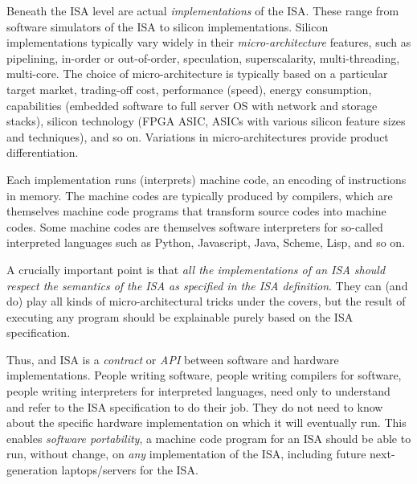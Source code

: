 
Beneath the ISA level are actual \emph{implementations} of the ISA.
These range from software simulators of the ISA to silicon
implementations.  Silicon implementations typically vary widely in
their \emph{micro-architecture} features, such as pipelining, in-order
or out-of-order, speculation, superscalarity, multi-threading,
multi-core.  The choice of micro-architecture is typically based on a
particular target market, trading-off cost, performance (speed),
energy consumption, capabilities (embedded software to full server OS
with network and storage stacks), silicon technology (FPGA {\vs} ASIC,
ASICs with various silicon feature sizes and techniques), and so on.
Variations in micro-architectures provide product differentiation.


Each implementation runs (interprets) machine code, {\ie} an encoding
of instructions in memory.  The machine codes are typically produced
by compilers, which are themselves machine code programs that
transform source codes into machine codes.  Some machine codes are
themselves software interpreters for so-called interpreted languages
such as Python, Javascript, Java, Scheme, Lisp, and so on.

A crucially important point is that \emph{all the implementations of
an ISA should respect the semantics of the ISA as specified in the ISA
definition}.  They can (and do) play all kinds of micro-architectural
tricks under the covers, but the result of executing any program
should be explainable purely based on the ISA specification.


Thus, and ISA is a \emph{contract} or \emph{API} between software and
hardware implementations.  People writing software, people writing
compilers for software, people writing interpreters for interpreted
languages, {\etc} need only to understand and refer to the ISA
specification to do their job.  They do not need to know about the
specific hardware implementation on which it will eventually run.
This enables \emph{software portability}, {\ie} a machine code program
for an ISA should be able to run, without change, on \emph{any}
implementation of the ISA, including future next-generation
laptops/servers for the ISA.


